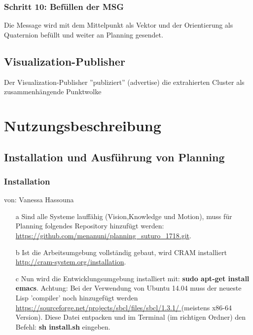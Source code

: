 \documentclass{suturo}
\makeatletter
\newcommand{\chapterauthor}[1]{%
  {\parindent0pt\vspace*{-27pt}%
  \linespread{0}\small\begin{flushright}von: #1\end{flushright}%
  \par\nobreak\vspace*{0pt}}
  \@afterheading%
}
\makeatother
\begin{document}
\subsubsection{Schritt 10: Befüllen der MSG }
Die Message wird mit dem Mittelpunkt als Vektor und der Orientierung als Quaternion befüllt und weiter an Planning gesendet.

\subsection*{Visualization-Publisher}
Der Visualization-Publisher ''publiziert'' (advertise) die extrahierten Cluster als zusammenhängende Punktwolke

\newpage
\section{Nutzungsbeschreibung}

\subsection{Installation und Ausführung von Planning}

\subsubsection{Installation}
\chapterauthor{Vanessa Hassouna}
\begin{itemize}


\item[a] Sind alle Systeme lauffähig (Vision,Knowledge und Motion), muss für Planning folgendes Repository hinzufügt werden: \url{https://github.com/menanuni/planning_suturo_1718.git}. 

\item[b] Ist die Arbeitsumgebung vollständig gebaut, wird CRAM installiert \url{http://cram-system.org/installation}.

\item[c] Nun wird die Entwicklungsumgebung installiert mit: \textbf{sudo apt-get install emacs}. Achtung: Bei der Verwendung von Ubuntu 14.04 muss der neueste Lisp 'compiler' noch hinzugefügt werden \url{https://sourceforge.net/projects/sbcl/files/sbcl/1.3.1/
} (meistens x86-64 Version). Diese Datei entpacken und im Terminal (im richtigen Ordner) den Befehl: \textbf{sh install.sh} eingeben.
\end{itemize}
\end{document}
